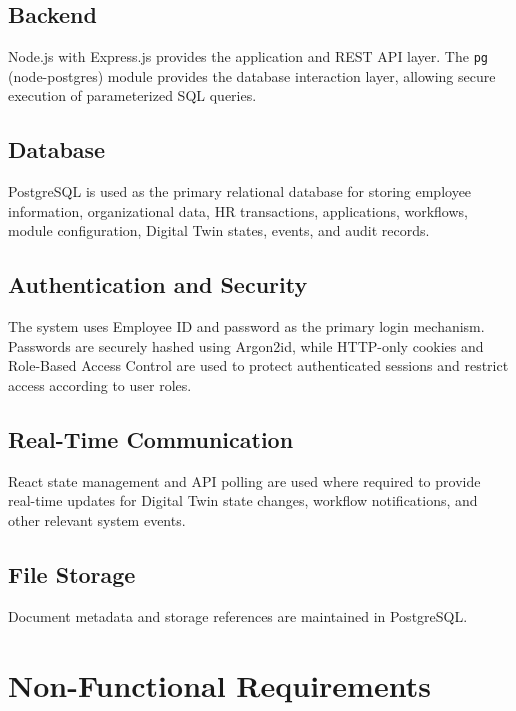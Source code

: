 \documentclass[12pt,a4paper]{article}
\begin{document}
\subsection{Backend}

Node.js with Express.js provides the application and REST API layer.
The \texttt{pg} (node-postgres) module provides the database interaction
layer, allowing secure execution of parameterized SQL queries.

\subsection{Database}

PostgreSQL is used as the primary relational database for storing
employee information, organizational data, HR transactions,
applications, workflows, module configuration, Digital Twin states,
events, and audit records.

\subsection{Authentication and Security}

The system uses Employee ID and password as the primary login
mechanism. Passwords are securely hashed using Argon2id, while
HTTP-only cookies and Role-Based Access Control are used to protect
authenticated sessions and restrict access according to user roles.

\subsection{Real-Time Communication}

React state management and API polling are used where required to provide real-time
updates for Digital Twin state changes, workflow notifications, and
other relevant system events.

\subsection{File Storage}
Document metadata and storage references are maintained
in PostgreSQL.

\section{Non-Functional Requirements}
\end{document}
